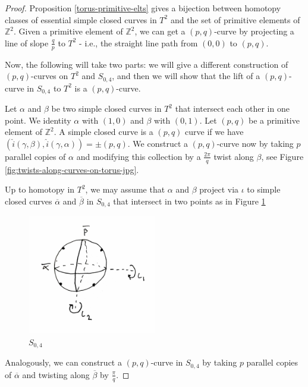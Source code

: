 \documentclass[reqno]{amsart}
\theoremstyle{definition}
\theoremstyle{remark}
\begin{document}
\begin{proof}
    Proposition \ref{torus-primitive-elts} gives
    a bijection between homotopy classes
    of essential simple closed curves in $T^2$ and the
    set of primitive elements of $\mathbb{Z}^2$.
    Given a primitive element of $\mathbb{Z}^2$, we can
    get a $\left( p,q \right) $-curve by projecting
    a line of slope $\frac{q}{p}$ to $T^2$ - i.e., the straight
    line path from $\left( 0,0 \right) $ to 
    $\left( p,q \right) $.

    Now, the following will take two
    parts: we will give a different construction of
    $\left( p,q \right) $-curves on $T^2$ and
    $S_{0,4}$, and then we will show that
    the lift of a $\left( p,q \right) $-curve in
    $S_{0,4}$ to $T^2$ is a $\left( p,q \right) $-curve.


    Let $\alpha$ and $\beta$ be two simple closed
    curves in $T^2$ that intersect each other in
    one point. We identity $\alpha$ with
    $\left( 1,0 \right) $ and $\beta$ with
    $\left( 0,1 \right) $. Let
    $\left( p,q \right) $ be a primitive element 
    of $\mathbb{Z}^2$. A simple closed curve is a
    $\left( p,q \right) $ curve if we have
    $\left( \hat{i}\left( \gamma,\beta \right) ,
    \hat{i} \left( \gamma,\alpha \right) \right) 
    = \pm \left( p,q \right) $. We
    construct a $\left( p,q \right) $-curve now by
    taking $p$ parallel copies of  $\alpha$ and
    modifying this collection by a
    $\frac{2\pi}{q}$ twist along $\beta$, see Figure
    \ref{fig:twists-along-curves-on-torus-jpg}.

    Up to homotopy in $T^2$, we may assume that
    $\alpha$ and $\beta$ project via $\iota$ to
    simple closed curves
    $\overline{\alpha}$ and $\overline{\beta}$ 
    in $S_{0,4}$ that intersect in two points as in
    Figure \ref{fig:S04-jpg}
    
    \begin{figure}[H]
        \centering
        \includegraphics[width=0.5\textwidth]{S04.jpg}
        \caption{$S_{0,4}$}
        \label{fig:S04-jpg}
    \end{figure}
    Analogously, we can construct a $\left( p,q \right) $-curve
    in $S_{0,4}$ by taking $p$ parallel copies of
    $\overline{\alpha}$ and twisting
    along $\overline{\beta}$ by
    $\frac{\pi}{q}$.


\end{proof}
\end{document}
